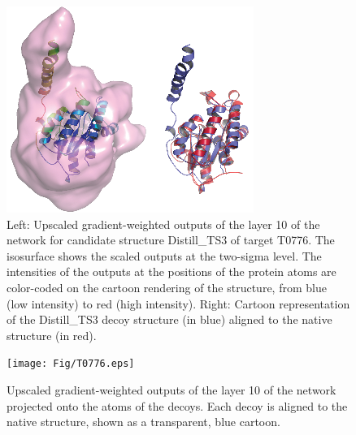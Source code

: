 \begin{figure}[H]
    \centering
    \includegraphics[width=0.5\linewidth]{Fig/FigT0776.eps}
%
    \caption{Left: Upscaled gradient-weighted outputs of the layer 10 of the network for
    candidate structure Distill\_TS3 of target T0776. The isosurface
    shows the scaled outputs at the two-sigma level. The intensities
    of the outputs at the positions of the protein atoms are
    color-coded on the cartoon rendering of the structure, from blue
    (low intensity) to red (high intensity). Right: Cartoon
    representation of the Distill\_TS3 decoy structure (in blue)
    aligned to the native structure (in red).}
%
    \label{Fig:GradCAMT0776}
\end{figure}

\begin{figure}[H]
    \centering
    \texttt{[image: Fig/T0776.eps]}
%
    \caption{Upscaled gradient-weighted outputs of the layer 10 of the network
    projected onto the atoms of the decoys. Each decoy is aligned to
    the native structure, shown as a transparent, blue cartoon.}
%
    \label{Fig:GradCAMT0776_more}
\end{figure}

